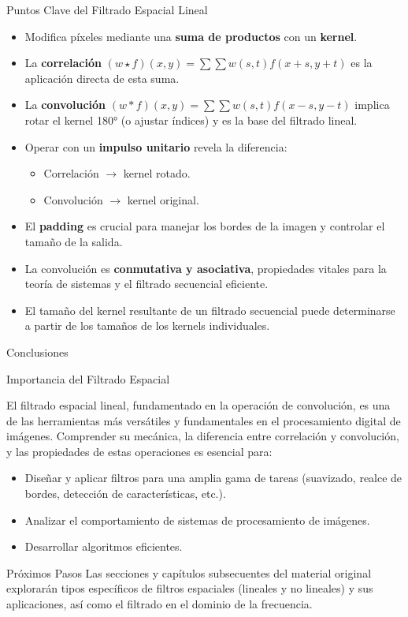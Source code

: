\documentclass[10pt]{beamer}
\begin{document}
\begin{frame}{Puntos Clave del Filtrado Espacial Lineal}
{\footnotesize
\begin{itemize}
\item Modifica píxeles mediante una \textbf{suma de productos} con un \textbf{kernel}.
\item La \textbf{correlación} $(w \star f)(x,y) = \sum \sum w(s,t)f(x+s,y+t)$ es la aplicación directa de esta suma.
\item La \textbf{convolución} $(w * f)(x,y) = \sum \sum w(s,t)f(x-s,y-t)$ implica rotar el kernel 180° (o ajustar índices) y es la base del filtrado lineal.
\item Operar con un \textbf{impulso unitario} revela la diferencia:
\begin{itemize}
\item Correlación $\rightarrow$ kernel rotado.
\item Convolución $\rightarrow$ kernel original.
\end{itemize}
\item El \textbf{padding} es crucial para manejar los bordes de la imagen y controlar el tamaño de la salida.
\item La convolución es \textbf{conmutativa y asociativa}, propiedades vitales para la teoría de sistemas y el filtrado secuencial eficiente.
\item El tamaño del kernel resultante de un filtrado secuencial puede determinarse a partir de los tamaños de los kernels individuales.
\end{itemize}
}
\end{frame}

\begin{frame}{Conclusiones}
\begin{block}{\footnotesize Importancia del Filtrado Espacial}
{\footnotesize El filtrado espacial lineal, fundamentado en la operación de convolución, es una de las herramientas más versátiles y fundamentales en el procesamiento digital de imágenes.
\vspace{0.1cm}
Comprender su mecánica, la diferencia entre correlación y convolución, y las propiedades de estas operaciones es esencial para:
\begin{itemize}
\item Diseñar y aplicar filtros para una amplia gama de tareas (suavizado, realce de bordes, detección de características, etc.).
\item Analizar el comportamiento de sistemas de procesamiento de imágenes.
\item Desarrollar algoritmos eficientes.
\end{itemize}
}
\end{block}
\vspace{0.1cm}
\begin{alertblock}{\footnotesize Próximos Pasos}
{\footnotesize Las secciones y capítulos subsecuentes del material original explorarán tipos específicos de filtros espaciales (lineales y no lineales) y sus aplicaciones, así como el filtrado en el dominio de la frecuencia.}
\end{alertblock}
\end{frame}
\end{document}
